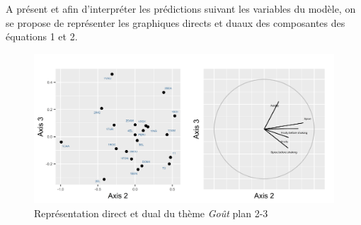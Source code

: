 \documentclass[a4paper,french,10pt]{article}
\begin{document}
\newpage

A présent et afin d'interpréter les prédictions suivant les variables du modèle, on se propose de représenter les graphiques directs et duaux des composantes des équations 1 et 2.


\begin{figure}[htp] 
	\centering
	\hfill%
\end{figure}
\begin{figure}[htp] 
	\centering
	\includegraphics[scale=0.8]{images/Plot.IndVar_B3_2.3.png}
	\caption{Représentation direct et dual du thème \textit{Goût} plan 2-3}
\end{figure}
\end{document}
